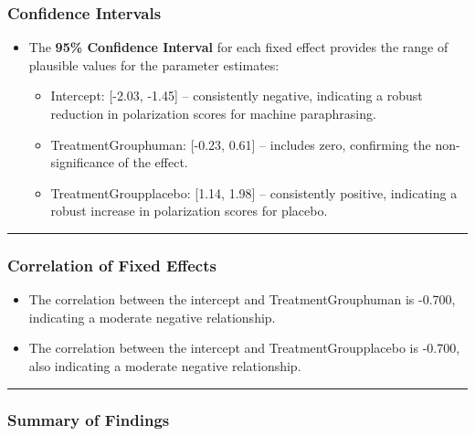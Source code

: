 \documentclass[
]{article}
\providecommand{\tightlist}{%
  \setlength{\itemsep}{0pt}\setlength{\parskip}{0pt}}
\begin{document}
\subsubsection{\texorpdfstring{\textbf{Confidence
Intervals}}{Confidence Intervals}}\label{confidence-intervals-3}

\begin{itemize}
\tightlist
\item
  The \textbf{95\% Confidence Interval} for each fixed effect provides
  the range of plausible values for the parameter estimates:

  \begin{itemize}
  \tightlist
  \item
    Intercept: {[}-2.03, -1.45{]} -- consistently negative, indicating a
    robust reduction in polarization scores for machine paraphrasing.
  \item
    TreatmentGrouphuman: {[}-0.23, 0.61{]} -- includes zero, confirming
    the non-significance of the effect.
  \item
    TreatmentGroupplacebo: {[}1.14, 1.98{]} -- consistently positive,
    indicating a robust increase in polarization scores for placebo.
  \end{itemize}
\end{itemize}

\begin{center}\rule{0.5\linewidth}{0.5pt}\end{center}

\subsubsection{\texorpdfstring{\textbf{Correlation of Fixed
Effects}}{Correlation of Fixed Effects}}\label{correlation-of-fixed-effects-3}

\begin{itemize}
\tightlist
\item
  The correlation between the intercept and TreatmentGrouphuman is
  -0.700, indicating a moderate negative relationship.
\item
  The correlation between the intercept and TreatmentGroupplacebo is
  -0.700, also indicating a moderate negative relationship.
\end{itemize}

\begin{center}\rule{0.5\linewidth}{0.5pt}\end{center}

\subsubsection{\texorpdfstring{\textbf{Summary of
Findings}}{Summary of Findings}}\label{summary-of-findings-3}
\end{document}
